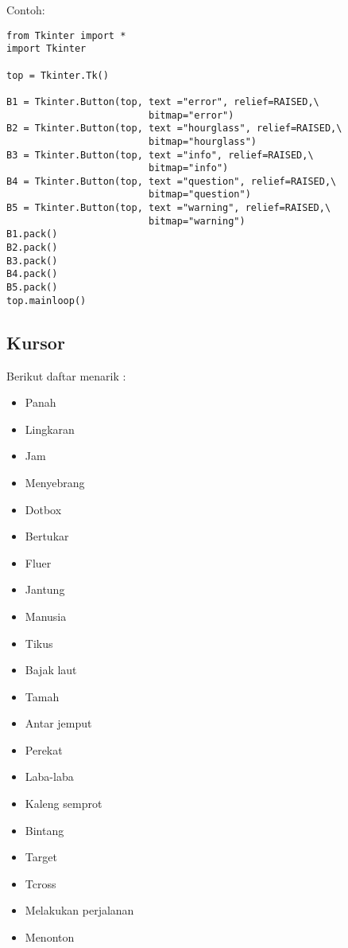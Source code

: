 \documentclass [12pt,a4paper,notitlepage,oneside,bahasa]{article}
\begin{document}
\vspace{12pt}
Contoh: \par
\begin{verbatim}
from Tkinter import *
import Tkinter

top = Tkinter.Tk()

B1 = Tkinter.Button(top, text ="error", relief=RAISED,\
                         bitmap="error")
B2 = Tkinter.Button(top, text ="hourglass", relief=RAISED,\
                         bitmap="hourglass")
B3 = Tkinter.Button(top, text ="info", relief=RAISED,\
                         bitmap="info")
B4 = Tkinter.Button(top, text ="question", relief=RAISED,\
                         bitmap="question")
B5 = Tkinter.Button(top, text ="warning", relief=RAISED,\
                         bitmap="warning")
B1.pack()
B2.pack()
B3.pack()
B4.pack()
B5.pack()
top.mainloop()
\end{verbatim}

\noindent 
\subsection{Kursor} \par
\noindent 
Berikut daftar menarik : \par
\noindent 
\begin{itemize}
	\item Panah 
	\item Lingkaran
	\item Jam 
	\item Menyebrang 
	\item Dotbox 
	\item Bertukar
	\item Fluer 
	\item Jantung 
	\item Manusia 
	\item Tikus
	\item Bajak laut 
	\item Tamah 
	\item Antar jemput 
	\item Perekat
	\item Laba-laba
	\item Kaleng semprot
	\item Bintang
	\item Target 
	\item Tcross 
	\item Melakukan perjalanan
	\item Menonton
\end{itemize}
\end{document}
